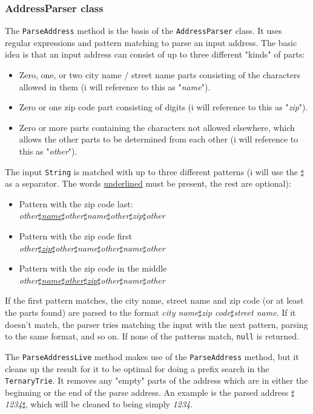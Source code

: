 \subsubsection{AddressParser class}
The \texttt{ParseAddress} method is the basis of the \texttt{AddressParser} class. It uses regular expressions and pattern matching to parse an input address. The basic idea is that an input address can consist of up to three different "kinds" of parts:
\begin{itemize}
	\item Zero, one, or two city name / street name parts consisting of the characters allowed in them (i will reference to this as "\textit{name}").
	\item Zero or one zip code part consisting of digits (i will reference to this as "\textit{zip}").
	\item Zero or more parts containing the characters not allowed elsewhere, which allows the other parts to be determined from each other (i will reference to this as "\textit{other}").
\end{itemize}
The input \texttt{String} is matched with up to three different patterns (i will use the $\sharp$ as a separator. The words \underline{underlined} must be present, the rest are optional):
\begin{itemize}
	\item Pattern with the zip code last: \\
		\textit{other$\sharp$\underline{name}$\sharp$other$\sharp$name$\sharp$other$\sharp$zip$\sharp$other}
	\item Pattern with the zip code first \\
	\textit{other$\sharp$\underline{zip}$\sharp$other$\sharp$name$\sharp$other$\sharp$name$\sharp$other}
	\item Pattern with the zip code in the middle \\
	\textit{other$\sharp$\underline{name$\sharp$other$\sharp$zip}$\sharp$other$\sharp$name$\sharp$other}
\end{itemize}
If the first pattern matches, the city name, street name and zip code (or at least the parts found) are parsed to the format \textit{city name$\sharp$zip code$\sharp$street name}. If it doesn't match, the parser tries matching the input with the next pattern, parsing to the same format, and so on. If none of the patterns match, \texttt{null} is returned.

The \texttt{ParseAddressLive} method makes use of the \texttt{ParseAddress} method, but it cleans up the result for it to be optimal for doing a prefix search in the \texttt{TernaryTrie}. It removes any "empty" parts of the address which are in either the beginning or the end of the parse address. An example is the parsed address \textit{$\sharp$1234$\sharp$}, which will be cleaned to being simply \textit{1234}.